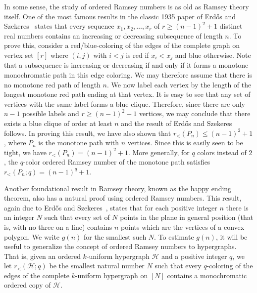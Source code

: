 \documentclass[11pt]{article}
\newcommand{\rord}{r_{<}}
\begin{document}
In some sense, the study of ordered Ramsey numbers is as old as Ramsey theory itself. One of the most famous results in the classic 1935 paper of Erd\H{o}s and Szekeres~\cite{ES35} states that every sequence $x_1, x_2, \ldots,x_r$ of $r \geq (n-1)^2+1$ distinct real numbers contains an increasing  or decreasing subsequence of length $n$. To prove this, consider a red/blue-coloring of the edges of the complete graph on vertex set $[r]$ where $(i,j)$ with $i<j$ is red if $x_i<x_j$ and blue otherwise. Note that a subsequence is increasing or decreasing if and only if it forms a monotone monochromatic path in this edge coloring. We may therefore assume that there is no monotone red path of length $n$. We now label each vertex by the length of the longest monotone red path ending at that vertex. It is easy to see that any set of vertices with the same label forms a blue clique. Therefore, since there are only $n-1$ possible labels and $r \geq (n-1)^2 + 1$ vertices, we may conclude that there exists a blue clique of order at least $n$ and the result of Erd\H{o}s and Szekeres follows. In proving this result, we have also shown that $r_<(P_n) \leq (n-1)^2 + 1$, where $P_n$ is the monotone path with $n$ vertices. Since this is easily seen to be tight, we have $r_<(P_n) = (n-1)^2 + 1$. More generally, for $q$ colors instead of $2$, the $q$-color ordered Ramsey number of the monotone path satisfies $\rord(P_n;q)=(n-1)^{q}+1$.

Another foundational result in Ramsey theory, known as the happy ending theorem, also has a natural proof using ordered Ramsey numbers. This result, again due to Erd\H{o}s and Szekeres~\cite{ES35}, states that for each positive integer $n$ there is an integer $N$ such that every set of $N$ points in the plane in general position (that is, with no three on a line) contains $n$ points which are the vertices of a convex polygon. We write $g(n)$ for the smallest such $N$. To estimate $g(n)$, it will be useful to generalize the concept of ordered Ramsey numbers to hypergraphs. That is, given an ordered $k$-uniform hypergraph $\mathcal{H}$ and a positive integer $q$, we let $\rord(\mathcal{H};q)$ be the smallest natural number $N$ such that every $q$-coloring of the edges of the complete $k$-uniform hypergraph on $[N]$ contains a monochromatic ordered copy of $\mathcal{H}$.
\end{document}
